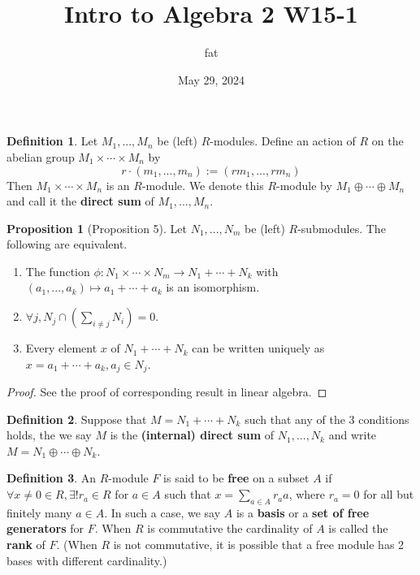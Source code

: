 \documentclass{article}
\title{Intro to Algebra 2 W15-1}
\author{fat}
\date{May 29, 2024}
\theoremstyle{definition}
\newtheorem{dfn}{Definition}
\newtheorem{prop}{Proposition}
\begin{document}
\maketitle
\thispagestyle{fancy}
\renewcommand{\footrulewidth}{0.4pt}
\cfoot{\thepage}
\renewcommand{\headrulewidth}{0.4pt}

\begin{dfn}
	Let $M_1, ..., M_n$ be (left) $R$-modules.
	Define an action of $R$ on the abelian group $M_1 \times \cdots \times M_n$ by 
	\[
		r \cdot (m_1, ..., m_n) := (r m_1, ..., r m_n)
	\]
	Then $M_1 \times \cdots \times M_n$ is an $R$-module.
	We denote this $R$-module by $M_1 \oplus \cdots \oplus M_n$ and call it the \textbf{direct sum} of $M_1, ..., M_n$.
\end{dfn}

\begin{prop}[Proposition 5]
	Let $N_1, ..., N_m$ be (left) $R$-submodules.
	The following are equivalent.
	\begin{enumerate}
		\item[(1)] The function $\phi: N_1 \times \cdots \times N_m \to N_1 + \cdots + N_k$ with $(a_1, ..., a_k) \mapsto a_1 + \cdots + a_k$ is an isomorphism.
			
		\item[(2)] $\forall j, N_j \cap (\sum_{i \neq j} N_i) = 0$.

		\item[(3)] Every element $x$ of $N_1 + \cdots + N_k$ can be written uniquely as $x = a_1 + \cdots + a_k, a_j \in N_j$.
	\end{enumerate}
\end{prop}

\begin{proof}
	See the proof of corresponding result in linear algebra.
\end{proof}

\begin{dfn}
	Suppose that $M = N_1 + \cdots + N_k$ such that any of the 3 conditions holds, the we say $M$ is the \textbf{(internal) direct sum} of $N_1, ..., N_k$ and write $M = N_1 \oplus \cdots \oplus N_k$.
\end{dfn}

\begin{dfn}
	An $R$-module $F$ is said to be \textbf{free} on a subset $A$ if $\forall x \neq 0 \in R, \exists ! r_a \in R$ for $a \in A$ such that $x = \sum_{a \in A} r_a a$, where $r_a = 0$ for all but finitely many $a \in A$.
	In such a case, we say $A$ is a \textbf{basis} or a \textbf{set of free generators} for $F$.
	When $R$ is commutative the cardinality of $A$ is called the \textbf{rank} of $F$.
	(When $R$ is not commutative, it is possible that a free module has 2 bases with different cardinality.)
\end{dfn}
\end{document}
